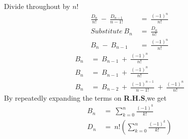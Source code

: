     Divide throughout by $n!$  
    \begin{align}
    \frac{D_n}{n!} ~-~ \frac{D_{n-1}}{{n-1}!}  ~&=~ \frac{(-1)^n}{n!} \nonumber\\
      Substitute~B_n~&=~\frac{D_n}{n!} \nonumber \\
    B_{n}~-~B_{n-1} ~&=~ \frac{(-1)^n}{n!} \nonumber 
    \end{align}
    \begin{align}
    B_{n} ~&=~ B_{n-1}~+~\frac{(-1)^n}{n!} \nonumber \\
    B_{n} ~&=~ B_{n-1}~+~\frac{(-1)^n}{n!} \nonumber \\
     B_{n} ~&=~ B_{n-2}~+~\frac{(-1)^{n-1}}{{n-1}!}~+~\frac{(-1)^n}{n!} \nonumber 
\end{align}
By repeatedly expanding the terms on \textbf{R.H.S},we get
\begin{align}
    B_{n} ~&=~ \sum_{k=0}^{n}\frac{(-1)^k}{k!} \nonumber \\
    D_{n} ~&=~ n!(\sum_{k=0}^{n} \frac{(-1)^k}{k!}) \nonumber
\end{align}